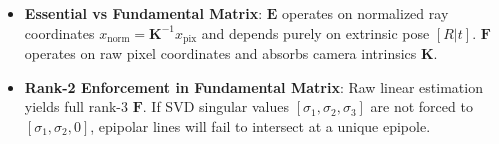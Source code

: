 \begin{trap}
\begin{itemize}
\item \textbf{Essential vs Fundamental Matrix}: $\mathbf{E}$ operates on normalized ray coordinates $x_{\text{norm}} = \mathbf{K}^{-1} x_{\text{pix}}$ and depends purely on extrinsic pose $[R|t]$. $\mathbf{F}$ operates on raw pixel coordinates and absorbs camera intrinsics $\mathbf{K}$.
\item \textbf{Rank-2 Enforcement in Fundamental Matrix}: Raw linear estimation yields full rank-3 $\mathbf{F}$. If SVD singular values $[\sigma_1, \sigma_2, \sigma_3]$ are not forced to $[\sigma_1, \sigma_2, 0]$, epipolar lines will fail to intersect at a unique epipole.
\end{itemize}
\end{trap}
